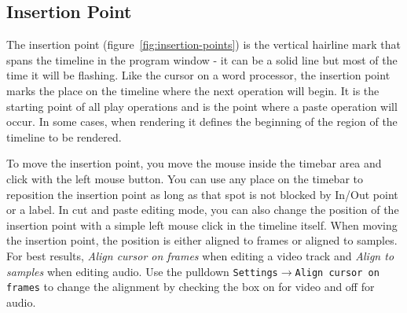 \subsection{Insertion Point}%
\label{sub:insertion_point}

The insertion point (figure~\ref{fig:insertion-points}) is the vertical hairline mark that spans the timeline in the program window - it can be a solid line but most of the time it will be flashing. 
Like the cursor on a word processor, the insertion point marks the place on the timeline where the next
operation will begin. It is the starting point of all play operations and is the point where a paste operation will occur. 
In some cases, when rendering it defines the beginning of the region of the timeline to be rendered. 

To move the insertion point, you move the mouse inside the timebar area and click with the left mouse button. 
You can use any place on the timebar to reposition the insertion point as long as that spot is not blocked
by In/Out point or a label. 
In cut and paste editing mode, you can also change the position of the insertion point with a simple 
left mouse click in the timeline itself.
When moving the insertion point, the position is either aligned to frames or aligned to samples. 
For best results, \textit{Align cursor on frames} when editing a video track and \textit{Align to samples} when editing audio. 
Use the pulldown \texttt{Settings$\rightarrow$Align cursor on frames} to change the alignment by
checking the box on for video and off for audio.

